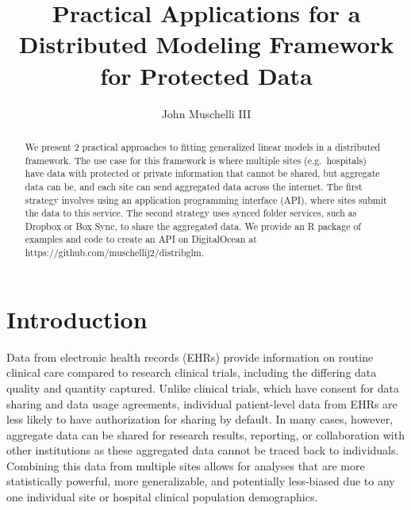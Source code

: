 \documentclass[]{elsarticle} %
\begin{document}
\begin{frontmatter}

  \title{Practical Applications for a Distributed Modeling Framework for Protected Data}
    \author[Johns Hopkins Bloomberg School of Public Health]{John Muschelli III}
      \address[Johns Hopkins Bloomberg School of Public Health]{Department of Biostatistics, 615 N Wolfe St, Baltimore MD, 21205}
    
  \begin{abstract}
  We present 2 practical approaches to fitting generalized linear models in a distributed framework. The use case for this framework is where multiple sites (e.g.~hospitals) have data with protected or private information that cannot be shared, but aggregate data can be, and each site can send aggregated data across the internet. The first strategy involves using an application programming interface (API), where sites submit the data to this service. The second strategy uses synced folder services, such as Dropbox or Box Sync, to share the aggregated data. We provide an R package of examples and code to create an API on DigitalOcean at https://github.com/muschellij2/distribglm.
  \end{abstract}
  
 \end{frontmatter}

\hypertarget{introduction}{%
\section{Introduction}\label{introduction}}

Data from electronic health records (EHRs) provide information on routine clinical care compared to research clinical trials, including the differing data quality and quantity captured. Unlike clinical trials, which have consent for data sharing and data usage agreements, individual patient-level data from EHRs are less likely to have authorization for sharing by default. In many cases, however, aggregate data can be shared for research results, reporting, or collaboration with other institutions as these aggregated data cannot be traced back to individuals. Combining this data from multiple sites allows for analyses that are more statistically powerful, more generalizable, and potentially less-biased due to any one individual site or hospital clinical population demographics.
\end{document}

